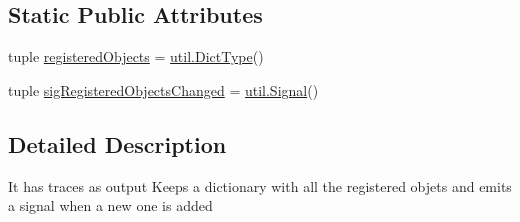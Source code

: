 \subsection*{Static Public Attributes}
\begin{DoxyCompactItemize}
\item 
tuple \hyperlink{classsoftware_1_1chipwhisperer_1_1common_1_1utils_1_1tracesource_1_1TraceSource_acb73a0d7494d4b9f143b1fe693cb886c}{registered\+Objects} = \hyperlink{namespacesoftware_1_1chipwhisperer_1_1common_1_1utils_1_1util_aa256ae974052a2cfddc80fd21216b08d}{util.\+Dict\+Type}()
\item 
tuple \hyperlink{classsoftware_1_1chipwhisperer_1_1common_1_1utils_1_1tracesource_1_1TraceSource_ab3d2b78b82dd89170071845840b4f1a6}{sig\+Registered\+Objects\+Changed} = \hyperlink{classsoftware_1_1chipwhisperer_1_1common_1_1utils_1_1util_1_1Signal}{util.\+Signal}()
\end{DoxyCompactItemize}


\subsection{Detailed Description}
\begin{DoxyVerb}It has traces as output
Keeps a dictionary with all the registered objets and emits a signal when a new one is added
\end{DoxyVerb}
 

